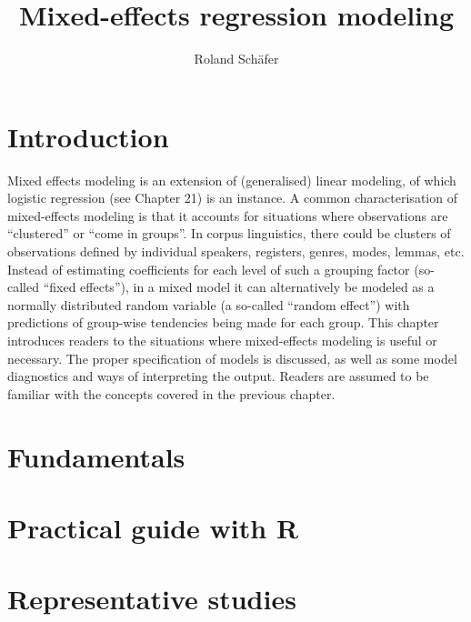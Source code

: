 \documentclass[graybox]{svmult}
\title{Mixed-effects regression modeling}
\author{Roland Schäfer}
\institute{Roland Schäfer \at Deutsche und niederländische Philologie, Freie Universität Berlin \email{roland.schaefer@fu-berlin.de}}
\begin{document}
       

\setcounter{chapter}{21}
\renewcommand*\thesection{\arabic{section}}

\maketitle

\section{Introduction}
\label{sec:introduction}

Mixed effects modeling is an extension of (generalised) linear modeling, of which logistic regression (see Chapter 21) is an instance.
A common characterisation of mixed-effects modeling is that it accounts for situations where observations are ``clustered'' or ``come in groups''.
In corpus linguistics, there could be clusters of observations defined by individual speakers, registers, genres, modes, lemmas, etc.
Instead of estimating coefficients for each level of such a grouping factor (so-called ``fixed effects''), in a mixed model it can alternatively be modeled as a normally distributed random variable (a so-called ``random effect'') with predictions of group-wise tendencies being made for each group.
This chapter introduces readers to the situations where mixed-effects modeling is useful or necessary.
The proper specification of models is discussed, as well as some model diagnostics and ways of interpreting the output.
Readers are assumed to be familiar with the concepts covered in the previous chapter.

\section{Fundamentals}
\label{sec:fundamentals}




\section{Practical guide with R}
\label{sec:practicalguidewithr}



\newpage
\section{Representative studies}
\end{document}

